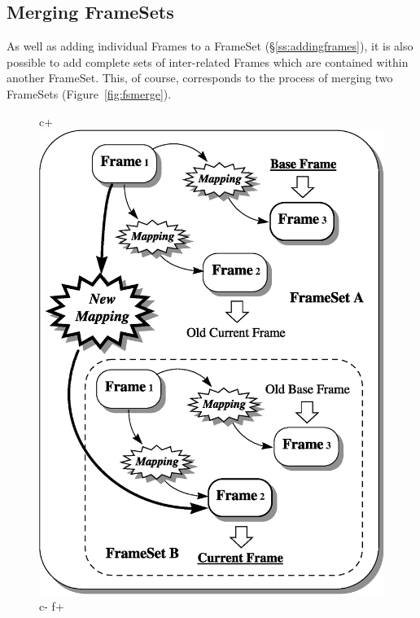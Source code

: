 \documentclass[twoside,11pt]{article}
\newenvironment{latexonly}{}{}
\newcommand{\secref}[1]{\S\ref{#1}}
\newcommand{\secref}[1]{\ref{#1}}
\begin{document}
\subsection{Merging FrameSets}

\begin{latexonly}
   As well as adding individual Frames to a FrameSet
   (\secref{ss:addingframes}), it is also possible to add complete sets of
   inter-related Frames which are contained within another
   FrameSet. This, of course, corresponds to the process of merging two
   FrameSets (Figure~\ref{fig:fsmerge}).
   \begin{figure}[hbtp]
   \begin{center}
c+
   \includegraphics[scale=0.6]{sun211_figures/fsmerge.eps}
c-
f+

\end{center}
\end{figure}
\end{latexonly}
\end{document}
